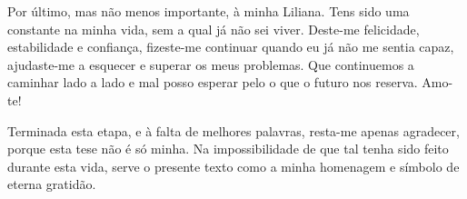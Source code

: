 \documentclass[class=report, crop=false, a4paper, 12pt]{standalone}
\begin{document}
\vspace{0.5\baselineskip}
\par Por último, mas não menos importante, à minha Liliana. Tens sido uma constante na minha vida, sem a qual já não sei viver. Deste-me felicidade, estabilidade e confiança, fizeste-me continuar quando eu já não me sentia capaz, ajudaste-me a esquecer e superar os meus problemas. Que continuemos a caminhar lado a lado e mal posso esperar pelo o que o futuro nos reserva. Amo-te!

\vspace{0.5\baselineskip}
\par Terminada esta etapa, e à falta de melhores palavras, resta-me apenas agradecer, porque esta tese não é só minha. Na impossibilidade de que tal tenha sido feito durante esta vida, serve o presente texto como a minha homenagem e símbolo de eterna gratidão.
\end{document}
